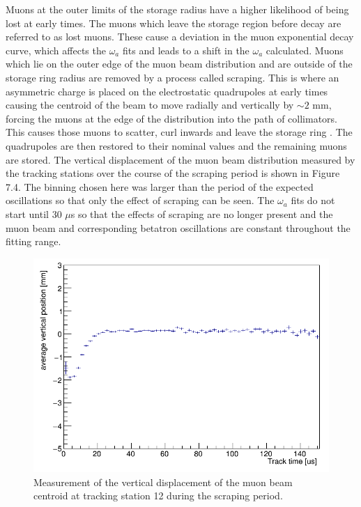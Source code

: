 Muons at the outer limits of the storage radius have a higher likelihood of being lost at early times. The muons which leave the storage region before decay are referred to as lost muons. These cause a deviation in the muon exponential decay curve, which affects the $\omega_{a}$ fits and leads to a shift in the $\omega_{a}$ calculated. Muons which lie on the outer edge of the muon beam distribution and are outside of the storage ring radius are removed by a process called scraping. This is where an asymmetric charge is placed on the electrostatic quadrupoles at early times causing the centroid of the beam to move radially and vertically by $\sim{2}$ mm, forcing the muons at the edge of the distribution into the path of collimators. This causes those muons to scatter, curl inwards and leave the storage ring \cite{muonloss1}. The quadrupoles are then restored to their nominal values and the remaining muons are stored. The vertical displacement of the muon beam distribution measured by the tracking stations over the course of the scraping period is shown in Figure 7.4. The binning chosen here was larger than the period of the expected oscillations so that only the effect of scraping can be seen. The $\omega_{a}$ fits do not start until 30 $\mu$s so that the effects of scraping are no longer present and the muon beam and corresponding betatron oscillations are constant throughout the fitting range.

\begin{figure}[!h]
\centering 
\includegraphics[scale=0.5]{Figures/AverageVerticalPosition_station12.png}
\decoRule
\caption{Measurement of the vertical displacement of the muon beam centroid at tracking station 12 during the scraping period.}
\label{fig:AverageVerticalPosition_station12}
\end{figure}

